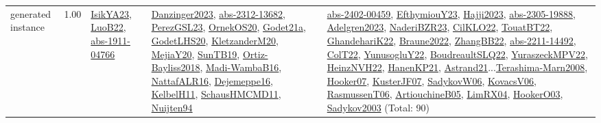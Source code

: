 {\begin{longtable}{p{3cm}r>{\raggedright\arraybackslash}p{6cm}>{\raggedright\arraybackslash}p{6cm}>{\raggedright\arraybackslash}p{8cm}}
\index{generated instance}\index{Benchmarks!generated instance}generated instance &  1.00 & \hyperref[detail:IsikYA23]{IsikYA23}, \hyperref[detail:LuoB22]{LuoB22}, \hyperref[detail:abs-1911-04766]{abs-1911-04766} & \hyperref[detail:Danzinger2023]{Danzinger2023}, \hyperref[detail:abs-2312-13682]{abs-2312-13682}, \hyperref[detail:PerezGSL23]{PerezGSL23}, \hyperref[detail:OrnekOS20]{OrnekOS20}, \hyperref[detail:Godet21a]{Godet21a}, \hyperref[detail:GodetLHS20]{GodetLHS20}, \hyperref[detail:KletzanderM20]{KletzanderM20}, \hyperref[detail:MejiaY20]{MejiaY20}, \hyperref[detail:SunTB19]{SunTB19}, \hyperref[detail:Ortiz-Bayliss2018]{Ortiz-Bayliss2018}, \hyperref[detail:Madi-WambaB16]{Madi-WambaB16}, \hyperref[detail:NattafALR16]{NattafALR16}, \hyperref[detail:Dejemeppe16]{Dejemeppe16}, \hyperref[detail:KelbelH11]{KelbelH11}, \hyperref[detail:SchausHMCMD11]{SchausHMCMD11}, \hyperref[detail:Nuijten94]{Nuijten94} & \hyperref[detail:abs-2402-00459]{abs-2402-00459}, \hyperref[detail:EfthymiouY23]{EfthymiouY23}, \hyperref[detail:Hajji2023]{Hajji2023}, \hyperref[detail:abs-2305-19888]{abs-2305-19888}, \hyperref[detail:Adelgren2023]{Adelgren2023}, \hyperref[detail:NaderiBZR23]{NaderiBZR23}, \hyperref[detail:CilKLO22]{CilKLO22}, \hyperref[detail:TouatBT22]{TouatBT22}, \hyperref[detail:GhandehariK22]{GhandehariK22}, \hyperref[detail:Braune2022]{Braune2022}, \hyperref[detail:ZhangBB22]{ZhangBB22}, \hyperref[detail:abs-2211-14492]{abs-2211-14492}, \hyperref[detail:ColT22]{ColT22}, \hyperref[detail:YunusogluY22]{YunusogluY22}, \hyperref[detail:BoudreaultSLQ22]{BoudreaultSLQ22}, \hyperref[detail:YuraszeckMPV22]{YuraszeckMPV22}, \hyperref[detail:HeinzNVH22]{HeinzNVH22}, \hyperref[detail:HanenKP21]{HanenKP21}, \hyperref[detail:Astrand21]{Astrand21}...\hyperref[detail:Terashima-Marn2008]{Terashima-Marn2008}, \hyperref[detail:Hooker07]{Hooker07}, \hyperref[detail:KusterJF07]{KusterJF07}, \hyperref[detail:SadykovW06]{SadykovW06}, \hyperref[detail:KovacsV06]{KovacsV06}, \hyperref[detail:RasmussenT06]{RasmussenT06}, \hyperref[detail:ArtiouchineB05]{ArtiouchineB05}, \hyperref[detail:LimRX04]{LimRX04}, \hyperref[detail:HookerO03]{HookerO03}, \hyperref[detail:Sadykov2003]{Sadykov2003} (Total: 90)\\

\end{longtable}}
